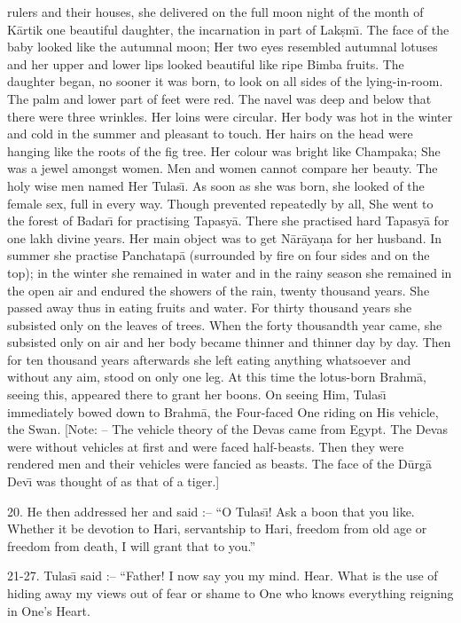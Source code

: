 rulers and their houses, she delivered on the full moon night of the month of K\=artik one beautiful daughter, the incarnation in part of Lak\d{s}m\={\i}. The face of the baby looked like the autumnal moon; Her two eyes resembled autumnal lotuses and her upper and lower lips looked beautiful like ripe Bimba fruits. The daughter began, no sooner it was born, to look on all sides of the lying-in-room. The palm and lower part of feet were red. The navel was deep and below that there were three wrinkles. Her loins were circular. Her body was hot in the winter and cold in the summer and pleasant to touch. Her hairs on the head were hanging like the roots of the fig tree. Her colour was bright like Champaka; She was a jewel amongst women. Men and women cannot compare her beauty. The holy wise men named Her Tulas\={\i}. As soon as she was born, she looked of the female sex, full in every way. Though prevented repeatedly by all, She went to the forest of Badar\={\i} for practising Tapasy\=a. There she practised hard Tapasy\=a for one lakh divine years. Her main object was to get N\=ar\=aya\d{n}a for her husband. In summer she practise Panchatap\=a (surrounded by fire on four sides and on the top); in the winter she remained in water and in the rainy season she remained in the open air and endured the showers of the rain, twenty thousand years. She passed away thus in eating fruits and water. For thirty thousand years she subsisted only on the leaves of trees. When the forty thousandth year came, she subsisted only on air and her body became thinner and thinner day by day. Then for ten thousand years afterwards she left eating anything whatsoever and without any aim, stood on only one leg. At this time the lotus-born Brahm\=a, seeing this, appeared there to grant her boons. On seeing Him, Tulas\={\i} immediately bowed down to Brahm\=a, the Four-faced One riding on His vehicle, the Swan. [Note: -- The vehicle theory of the Devas came from Egypt. The Devas were without vehicles at first and were faced half-beasts. Then they were rendered men and their vehicles were fancied as beasts. The face of the D\=urg\=a Dev\={\i} was thought of as that of a tiger.]

20. He then addressed her and said :-- ``O Tulas\={\i}! Ask a boon that you like. Whether it be devotion to Hari, servantship to Hari, freedom from old age or freedom from death, I will grant that to you.''

21-27. Tulas\={\i} said :-- ``Father! I now say you my mind. Hear. What is the use of hiding away my views out of fear or shame to One who knows everything reigning in One's Heart.

